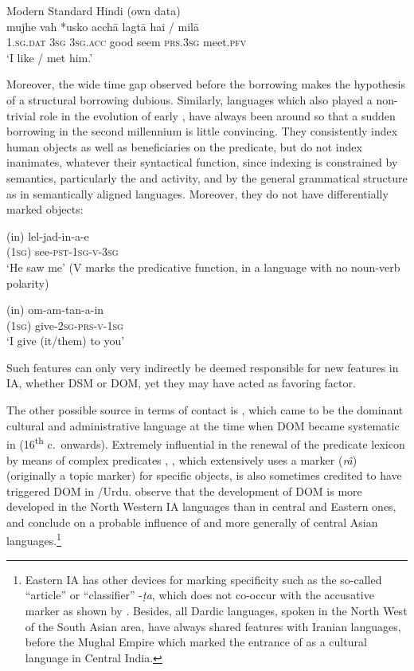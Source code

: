 \documentclass[output=paper]{LSP/langsci}
\begin{document}
\ea  Modern Standard Hindi (own data) \label{10-mo-ex:56b-rep}\\
\gll mujhe vah *usko acchā lagtā hai / milā\\
\textsc{1.sg.dat} \textsc{3sg} \textsc{3sg.acc} good seem \textsc{prs.3sg} { } meet.\textsc{pfv}\\
\glt ‘I like / met him.’ 
\z

Moreover, the wide time gap observed before the borrowing makes the hypothesis of a structural borrowing dubious. Similarly,  languages which also played a non-trivial role in the evolution of early  \citep{Witzel1995Early}, have always been around so that a sudden borrowing in the second millennium is little convincing. 
They consistently index human objects as well as beneficiaries on the predicate, but do not index inanimates, whatever their syntactical function, since indexing is constrained by semantics, particularly the  and activity, and by the general grammatical structure as in semantically aligned languages. 
Moreover, they do not have differentially marked objects:

\ea
\label{10-mo-ex:57}
\ea \label{10-mo-ex:57a}
\gll (in) lel-jad-in-a-e\\
 (\textsc{1sg}) see-\textsc{pst-1sg-v-3sg} \\
 \glt ‘He saw me’ (V marks the predicative function, in a language with no noun-verb polarity)
 
 \ex \label{10-mo-ex:57b}
 \gll (in) om-am-tan-a-in~\\
 (\textsc{1sg}) give-\textsc{2sg-prs-v-1sg}\\
\glt ‘I give (it/them) to you’
\z
\z

Such features can only very indirectly be deemed responsible for new features in IA, whether DSM \citep{Montaut2013Rise} or DOM, yet they may have acted as favoring factor. 

The other possible source in terms of contact is , which came to be the dominant cultural and administrative language at the time when DOM became systematic in  (16\textsuperscript{th} c.\, onwards). Extremely influential in the renewal of the predicate lexicon by means of complex predicates \citep{Montaut2015Noun-Verb}, , which extensively uses a marker (\textit{râ}) (originally a topic marker) for specific objects, is also sometimes credited to have triggered DOM in /Urdu. \citet[143]{Krishnamurtietal1986South} observe that the development of DOM is more developed in the North Western IA languages than in central and Eastern ones, and conclude on a probable influence of  and more generally of central Asian languages.\footnote{Eastern IA has other devices for marking specificity such as the so-called “article” or “classifier” -\textit{ṭa}, which does not co-occur with the accusative marker as shown by \citet{Dasgupta2015Basic}. Besides, all Dardic languages, spoken in the North West of the South Asian area, have always shared features with Iranian languages, before the Mughal Empire which marked the entrance of  as a cultural language in Central India.} 
\end{document}
